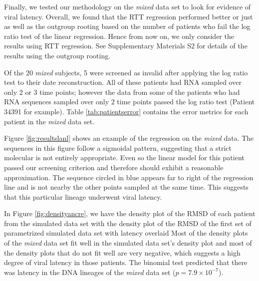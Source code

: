 \documentclass[12pt]{article}
\begin{document}


Finally, we tested our methodology on the {\em mixed} data set to look for evidence of viral latency.
Overall, we found that the RTT regression performed better or just as well as the outgroup rooting based on the number of patients who fail the log ratio test of the linear regression.
Hence from now on, we only consider the results using RTT regression.
See Supplementary Materials S2 for details of the results using the outgroup rooting.

Of the 20 \emph{mixed} subjects, 5 were screened as invalid after applying the log ratio test to their date reconstruction.
All of these patients had RNA sampled over only 2 or 3 time points; however the data from some of the patients who had RNA sequences sampled over only 2 time points passed the log ratio test (Patient 34391 for example).
Table \ref{tab:patientserror} contains the error metrics for each patient in the \emph{mixed} data set.

Figure \ref{fig:resultslanl} shows an example of the regression on the \emph{mixed} data.
The sequences in this figure follow a sigmoidal pattern, suggesting that a strict molecular is not entirely appropriate.
Even so the linear model for this patient passed our screening criterion and therefore should exhibit a reasonable approximation.
The sequence circled in blue appears far to right of the regression line and is not nearby the other points sampled at the same time.
This suggests that this particular lineage underwent viral latency.

In Figure \ref{fig:densityancre}, we have the density plot of the RMSD of each patient from the simulated data set with the density plot of the RMSD of the first set of parametrized simulated data set with latency overlaid
Most of the density plots of the \emph{mixed} data set fit well in the simulated data set's density plot and most of the density plots that do not fit well are very negative, which suggests a high degree of viral latency in those patients.
The binomial test predicted that there was latency in the DNA lineages of the \emph{mixed} data set ($p=7.9 \times 10^{-7}$).
\end{document}
